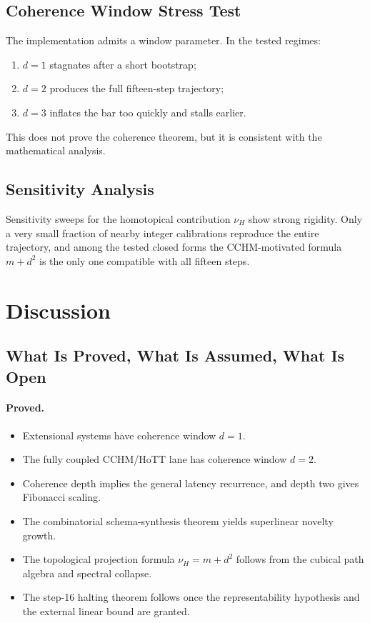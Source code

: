 \documentclass[11pt,a4paper]{article}
\theoremstyle{plain}
\theoremstyle{definition}
\theoremstyle{remark}
\begin{document}
\subsection{Coherence Window Stress Test}

The implementation admits a window parameter.  In the tested regimes:
\begin{enumerate}[nosep]
    \item $d=1$ stagnates after a short bootstrap;
    \item $d=2$ produces the full fifteen-step trajectory;
    \item $d=3$ inflates the bar too quickly and stalls earlier.
\end{enumerate}
This does not prove the coherence theorem, but it is consistent with the mathematical analysis.

\subsection{Sensitivity Analysis}

Sensitivity sweeps for the homotopical contribution $\nu_H$ show strong rigidity.  Only a very small fraction of nearby integer calibrations reproduce the entire trajectory, and among the tested closed forms the CCHM-motivated formula $m+d^2$ is the only one compatible with all fifteen steps.

\section{Discussion}
\label{sec:discussion}

\subsection{What Is Proved, What Is Assumed, What Is Open}

\paragraph{Proved.}
\begin{itemize}[nosep]
    \item Extensional systems have coherence window $d=1$.
    \item The fully coupled CCHM/HoTT lane has coherence window $d=2$.
    \item Coherence depth implies the general latency recurrence, and depth two gives Fibonacci scaling.
    \item The combinatorial schema-synthesis theorem yields superlinear novelty growth.
    \item The topological projection formula $\nu_H=m+d^2$ follows from the cubical path algebra and spectral collapse.
    \item The step-16 halting theorem follows once the representability hypothesis and the external linear bound are granted.
\end{itemize}
\end{document}
